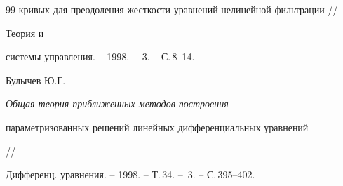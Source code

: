 \begin{thebibliography}{99}
{кривых для преодоления жесткости уравнений нелинейной фильтрации} // 


Теория и 


системы управления. -- 1998. -- \No\,3. -- С.\,8--14. 




Булычев Ю.Г. {\em Общая теория приближенных методов построения 


параметризованных решений линейных дифференциальных уравнений} // 


Дифференц. уравнения. -- 1998. -- Т.\,34. -- \No\,3. -- С.\,395--402. 


 


\end{thebibliography} 


 


\vskip 2cm 


 






 


\label{end} 


 


